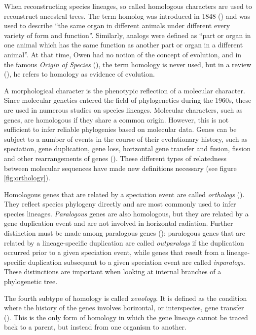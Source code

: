 When reconstructing species lineages, so called homologous characters are used
to reconstruct ancestral trees. The term homolog was introduced in 1848
(\cite{owen1848}) and was used to describe ``the same organ in different animals
under different every variety of form and function''. Similarly, analogs were
defined as ``part or organ in one animal which has the same function as another
part or organ in a different animal''. At that time, Owen had no notion of the
concept of evolution, and in the famous \emph{Origin of Species}
(\cite{darwin1859}), the term homology is never used, but in a review
(\cite{owen1860}), he refers to homology as evidence of evolution.

A morphological character is the phenotypic reflection of a molecular character.
Since molecular genetics entered the field of phylogenetics during the 1960s,
these are used in numerous studies on species lineages.  Molecular characters,
such as genes, are homologous if they share a common origin. However, this is
not sufficient to infer reliable phylogenies based on molecular data. Genes can
be subject to a number of events in the course of their evolutionary history,
such as speciation, gene duplication, gene loss, horizontal gene transfer and
fusion, fission and other rearrangements of genes (\cite{koonin2005}). These
different types of relatedness between molecular sequences have made new
definitions necessary (see figure \ref{fig:orthology}).



Homologous genes that are related by a speciation event are called
\emph{orthologs} (\cite{fitch1970}). They reflect species phylogeny directly and
are most commonly used to infer species lineages. \emph{Paralogous} genes are
also homologous, but they are related by a gene duplication event and are not
involved in horizontal radiation. Further distinction must be made among
paralogous genes (\cite{sonnhammer2002}): paralogous genes that are related by a
lineage-specific duplication are called \emph{outparalogs} if the duplication
occurred prior to a given speciation event, while genes that result from a
lineage-specific duplication subsequent to a given speciation event are called
\emph{inparalogs}.  These distinctions are important when looking at internal
branches of a phylogenetic tree.

The fourth subtype of homology is called \emph{xenology}. It is defined as the
condition where the history of the genes involves horizontal, or interspecies,
gene transfer (\cite{gray1983}). This is the only form of homology in which the
gene lineage cannot be traced back to a parent, but instead from one organism to
another.

